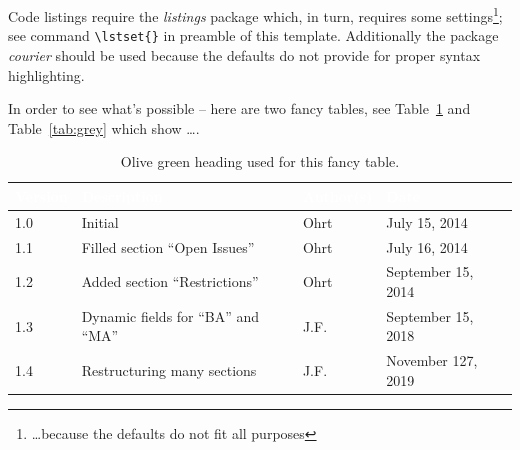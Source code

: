 Code listings require the \textit{listings} package which, in turn, requires some settings\footnote{\ldots because the defaults do not fit all purposes}; see command \verb+\lstset{}+ in preamble of this template. Additionally the package \textit{courier} should be used because the defaults do not provide for proper syntax highlighting.

\lstset{
  caption={Listing subtitles could and should contain whole sentences describing the important aspect of the listing.}, 
  basicstyle=\small\ttfamily, 
  label=lst:main, 
  language=C,
  frame=single,
  breaklines=true, %
  postbreak=\mbox{\textcolor{red}{$\hookrightarrow$}\space},
}

	

In order to see what's possible -- here are two fancy tables, see Table~\ref{tab:olive} and Table~\ref{tab:grey} which show \ldots.

\begin{center}
  \begin{table}[tp]
    \begin{tabularx}{\textwidth}{|l|l|p{1cm}|X|}\hline
      \rowcolor{olivegreen30}
      \textcolor{white}{\textbf{Version}}
         &\textcolor{white}{\textbf{Description}}  
           &  \textcolor{white}{\textbf{Author(s)}}  
             &\textcolor{white}{\textbf{Date}}\\
      \hline
      1.0  
        & Initial  	  	
          & Ohrt  	  	  
            & July 15, 2014\\
      \hline
      1.1  
        & Filled section ``Open Issues''  
          & Ohrt  	  	  
            & July 16, 2014\\
      \hline
      1.2  
        & Added section ``Restrictions''  
          & Ohrt  	  	  
            & September 15, 2014\\
      \hline
      1.3  
        & Dynamic fields for ``BA'' and ``MA'' 
          & J.F.  	  	  
            & September 15, 2018\\
      \hline    
      1.4  
        & Restructuring many sections 
          & J.F.  	  	  
            & November 127, 2019\\
      \hline       
      \end{tabularx}
    \caption[Fancy Table]{Olive green heading used for this fancy table.}
    \label{tab:olive}
  \end{table}
\end{center} 
  
